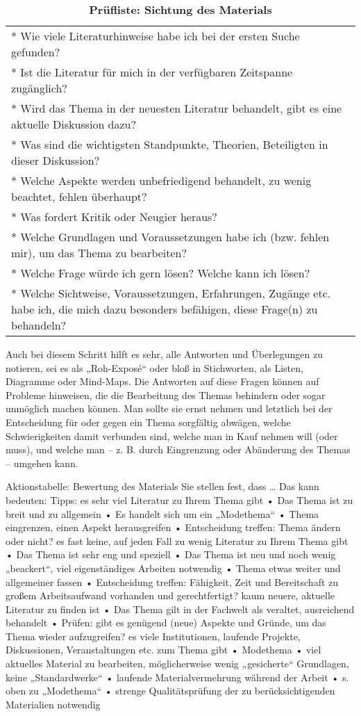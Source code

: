 \documentclass[]{article}
\begin{document}
\begin{longtable}[]{@{}l@{}}
\caption{\textbf{Prüfliste: Sichtung des Materials}}\tabularnewline
\toprule
* Wie viele Literaturhinweise habe ich bei der ersten Suche
gefunden?\tabularnewline
* Ist die Literatur für mich in der verfügbaren Zeitspanne
zugänglich?\tabularnewline
* Wird das Thema in der neuesten Literatur behandelt, gibt es eine
aktuelle Diskussion dazu?\tabularnewline
* Was sind die wichtigsten Standpunkte, Theorien, Beteiligten in dieser
Diskussion?\tabularnewline
* Welche Aspekte werden unbefriedigend behandelt, zu wenig beachtet,
fehlen überhaupt?\tabularnewline
* Was fordert Kritik oder Neugier heraus?\tabularnewline
* Welche Grundlagen und Voraussetzungen habe ich (bzw. fehlen mir), um
das Thema zu bearbeiten?\tabularnewline
* Welche Frage würde ich gern lösen? Welche kann ich
lösen?\tabularnewline
* Welche Sichtweise, Voraussetzungen, Erfahrungen, Zugänge etc. habe
ich, die mich dazu besonders befähigen, diese Frage(n) zu
behandeln?\tabularnewline
\bottomrule
\end{longtable}

Auch bei diesem Schritt hilft es sehr, alle Antworten und Überlegungen
zu notieren, sei es als „Roh-Exposé`` oder bloß in Stichworten, als
Listen, Diagramme oder Mind-Maps. Die Antworten auf diese Fragen können
auf Probleme hinweisen, die die Bearbeitung des Themas behindern oder
sogar unmöglich machen können. Man sollte sie ernst nehmen und letztlich
bei der Entscheidung für oder gegen ein Thema sorgfältig abwägen, welche
Schwierigkeiten damit verbunden sind, welche man in Kauf nehmen will
(oder muss), und welche man -- z. B. durch Eingrenzung oder Abänderung
des Themas -- umgehen kann.

Aktionstabelle: Bewertung des Materials Sie stellen fest, dass \ldots{}
Das kann bedeuten: Tipps: es sehr viel Literatur zu Ihrem Thema gibt •
Das Thema ist zu breit und zu allgemein • Es handelt sich um ein
„Modethema`` • Thema eingrenzen, einen Aspekt herausgreifen •
Entscheidung treffen: Thema ändern oder nicht? es fast keine, auf jeden
Fall zu wenig Literatur zu Ihrem Thema gibt • Das Thema ist sehr eng und
speziell • Das Thema ist neu und noch wenig „beackert``, viel
eigenständiges Arbeiten notwendig • Thema etwas weiter und allgemeiner
fassen • Entscheidung treffen: Fähigkeit, Zeit und Bereitschaft zu
großem Arbeitsaufwand vorhanden und gerechtfertigt? kaum neuere,
aktuelle Literatur zu finden ist • Das Thema gilt in der Fachwelt als
veraltet, ausreichend behandelt • Prüfen: gibt es genügend (neue)
Aspekte und Gründe, um das Thema wieder aufzugreifen? es viele
Institutionen, laufende Projekte, Diskussionen, Veranstaltungen etc. zum
Thema gibt • Modethema • viel aktuelles Material zu bearbeiten,
möglicherweise wenig „gesicherte`` Grundlagen, keine „Standardwerke`` •
laufende Materialvermehrung während der Arbeit • s. oben zu „Modethema``
• strenge Qualitätsprüfung der zu berücksichtigenden Materialien
notwendig
\end{document}
